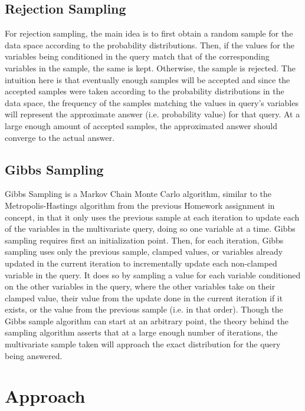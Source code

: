 \documentclass{article} %
\begin{document}
\subsection{Rejection Sampling}

For rejection sampling, the main idea is to first obtain a random sample for the data space according to the probability distributions. Then, if the values for the variables being conditioned in the query match that of the corresponding variables in the sample, the same is kept. Otherwise, the sample is rejected. The intuition here is that eventually enough samples will be accepted and since the accepted samples were taken according to the probability distributions in the data space, the frequency of the samples matching the values in query's variables will represent the approximate answer (i.e. probability value) for that query. At a large enough amount of accepted samples, the approximated answer should converge to the actual answer.

\subsection{Gibbs Sampling}

Gibbs Sampling is a Markov Chain Monte Carlo algorithm, similar to the Metropolis-Hastings algorithm from the previous Homework assignment in concept, in that it only uses the previous sample at each iteration to update each of the variables in the multivariate query, doing so one variable at a time. Gibbs sampling requires first an initialization point. Then, for each iteration, Gibbs sampling uses only the previous sample, clamped values, or variables already updated in the current iteration to incrementally update each non-clamped variable in the query. It does so by sampling a value for each variable conditioned on the other variables in the query, where the other variables take on their clamped value, their value from the update done in the current iteration if it exists, or the value from the previous sample (i.e. in that order). Though the Gibbs sample algorithm can start at an arbitrary point, the theory behind the sampling algorithm asserts that at a large enough number of iterations, the multivariate sample taken will approach the exact distribution for the query being answered.

\section{Approach}
\end{document}
